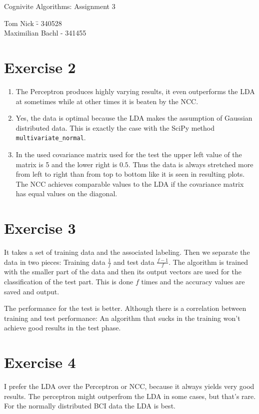 \documentclass[a4paper,10pt]{article}
\begin{document}
\begin{center}
\Large{Cognivite Algorithms: Assignment 3} \\
\end{center}
\begin{tabbing}
Tom Nick \hspace{2cm}\= - 340528\\
Maximilian Bachl \> - 341455 \\
\end{tabbing}

\section*{Exercise 2}
\begin{enumerate}
    \item The Perceptron produces highly varying results, it even outperforms the LDA at sometimes while at other times it is beaten by the NCC. 
    \item Yes, the data is optimal because the LDA makes the assumption of Gaussian distributed data. This is exactly the case with the SciPy method \texttt{multivariate\_normal}.
    \item In the used covariance matrix used for the test the upper left value of the matrix is 5 and the lower right is $0.5$. Thus the data is always stretched more from left to right than from top to bottom like it is seen in resulting plots. The NCC achieves comparable values to the LDA if the covariance matrix has equal values on the diagonal.
\end{enumerate}
\section*{Exercise 3}
It takes a set of training data and the associated labeling. Then we separate the data in two pieces: Training data $\frac 1 f$ and test data $\frac {f-1} {f}$. The algorithm is trained with the smaller part of the data and then its output vectors are used for the classification of the test part. This is done $f$ times and the accuracy values are saved and output.

The performance for the test is better. Although there is a correlation between training and test performance: An algorithm that sucks in the training won't achieve good results in the test phase.
\section*{Exercise 4}
I prefer the LDA over the Perceptron or NCC, because it always yields very good results. The perceptron might outperfrom the LDA in some cases, but that's rare. 
For the normally distributed BCI data the LDA is best.\\
\newline
\end{document}
